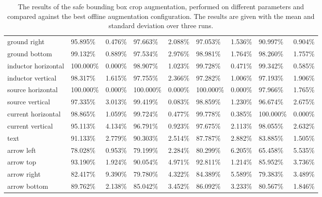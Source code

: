 \begin{table}[H]
\begin{center}
\begin{tabular}{|l|l|l|l|l|l|l|l|l|}
\rowcolor{lightgray!50}
ground right                    & 95.895\%  & 0.476\% & 97.663\%  & 2.088\% & 97.053\%  & 1.536\%  & 90.997\%  & 0.904\%   \\
ground bottom                   & 99.132\%  & 0.889\% & 97.534\%  & 2.976\% & 98.981\%  & 1.764\%  & 98.260\%  & 1.757\%   \\
\rowcolor{lightgray!50}
inductor horizontal             & 100.000\% & 0.000\% & 98.907\%  & 1.023\% & 99.728\%  & 0.471\%  & 99.342\%  & 0.585\%   \\
inductor vertical               & 98.317\%  & 1.615\% & 97.755\%  & 2.366\% & 97.282\%  & 1.006\%  & 97.193\%  & 1.906\%   \\
\rowcolor{lightgray!50}
source horizontal               & 100.000\% & 0.000\% & 100.000\% & 0.000\% & 100.000\% & 0.000\%  & 97.966\%  & 1.765\%   \\
source vertical                 & 97.335\%  & 3.013\% & 99.419\%  & 0.083\% & 98.859\%  & 1.230\%  & 96.674\%  & 2.675\%   \\
\rowcolor{lightgray!50}
current horizontal              & 98.865\%  & 1.059\% & 99.724\%  & 0.477\% & 99.778\%  & 0.385\%  & 100.000\% & 0.000\%   \\
current vertical                & 95.113\%  & 4.134\% & 96.791\%  & 0.923\% & 97.675\%  & 2.113\%  & 98.055\%  & 2.632\%   \\
\rowcolor{lightgray!50}
text                            & 91.133\%  & 2.779\% & 90.303\%  & 2.514\% & 87.787\%  & 2.882\%  & 83.885\%  & 1.505\%   \\
arrow left                      & 78.028\%  & 0.953\% & 79.199\%  & 2.284\% & 80.299\%  & 6.205\%  & 65.458\%  & 5.535\%   \\
\rowcolor{lightgray!50}
arrow top                       & 93.190\%  & 1.924\% & 90.054\%  & 4.971\% & 92.811\%  & 1.214\%  & 85.952\%  & 3.736\%   \\
arrow right                     & 82.417\%  & 9.390\% & 79.780\%  & 4.322\% & 84.389\%  & 5.589\%  & 79.383\%  & 3.489\%   \\
\rowcolor{lightgray!50}
arrow bottom                    & 89.762\%  & 2.138\% & 85.042\%  & 3.452\% & 86.092\%  & 3.233\%  & 80.567\%  & 1.846\%   \\
\hline

\end{tabular}
\caption{The results of the safe bounding box crop augmentation, performed on different parameters and compared against the best offline augmentation configuration. The results are given with the mean and standard deviation over three runs.}
\label{tab:yolo_bbox_safe_crop_augmentation_result}
\end{center}
\end{table}

